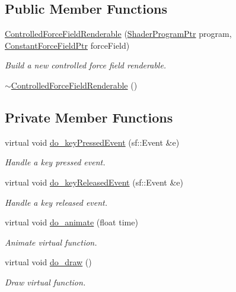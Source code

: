 \subsection*{Public Member Functions}
\begin{DoxyCompactItemize}
\item 
\hyperlink{classControlledForceFieldRenderable_a0b3f0aa9e5b4eca0146beefd5ba8862f}{Controlled\+Force\+Field\+Renderable} (\hyperlink{ShaderProgram_8hpp_af8e4af1ad4c53875ee5d32ab7e1f4966}{Shader\+Program\+Ptr} program, \hyperlink{ConstantForceField_8hpp_a7b80b566be4aeb0b5474a8aeb2e0ff49}{Constant\+Force\+Field\+Ptr} force\+Field)
\begin{DoxyCompactList}\small\item\em Build a new controlled force field renderable. \end{DoxyCompactList}\item 
\hyperlink{classControlledForceFieldRenderable_ad5dff1b4ecdbda434729e8a4ef68073a}{$\sim$\+Controlled\+Force\+Field\+Renderable} ()
\end{DoxyCompactItemize}
\subsection*{Private Member Functions}
\begin{DoxyCompactItemize}
\item 
virtual void \hyperlink{classControlledForceFieldRenderable_a7313ffabf0b3d4bf27c10d57d7f143de}{do\+\_\+key\+Pressed\+Event} (sf\+::\+Event \&e)
\begin{DoxyCompactList}\small\item\em Handle a key pressed event. \end{DoxyCompactList}\item 
virtual void \hyperlink{classControlledForceFieldRenderable_a68aaf096b1bf911717c9374abc51e3df}{do\+\_\+key\+Released\+Event} (sf\+::\+Event \&e)
\begin{DoxyCompactList}\small\item\em Handle a key released event. \end{DoxyCompactList}\item 
virtual void \hyperlink{classControlledForceFieldRenderable_a3ab6b5efaa5d5b988d92c4fee3e770a0}{do\+\_\+animate} (float time)
\begin{DoxyCompactList}\small\item\em Animate virtual function. \end{DoxyCompactList}\item 
virtual void \hyperlink{classControlledForceFieldRenderable_a5b73eb28c70b0a37ce4f69ec6a63823a}{do\+\_\+draw} ()
\begin{DoxyCompactList}\small\item\em Draw virtual function. \end{DoxyCompactList}\end{DoxyCompactItemize}
